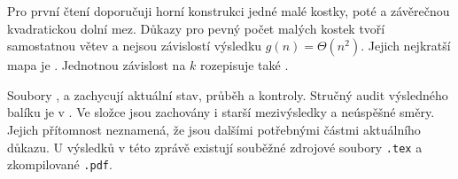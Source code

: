 \documentclass[11pt]{article}
\begin{document}
Pro první čtení doporučuji horní konstrukci jedné malé kostky,
poté  a závěrečnou kvadratickou
dolní mez. Důkazy pro pevný počet malých kostek tvoří samostatnou větev a nejsou
závislostí výsledku $g(n)=\Theta(n^2)$.
Jejich nejkratší mapa je
.
Jednotnou závislost na $k$ rozepisuje také
.

Soubory ,  a
 zachycují aktuální stav, průběh a kontroly.
Stručný audit výsledného balíku je v .
Ve složce jsou zachovány i starší mezivýsledky a neúspěšné směry.
Jejich přítomnost neznamená, že jsou dalšími potřebnými částmi
aktuálního důkazu. U výsledků v této zprávě existují souběžné zdrojové
soubory \texttt{.tex} a zkompilované \texttt{.pdf}.
\end{document}
